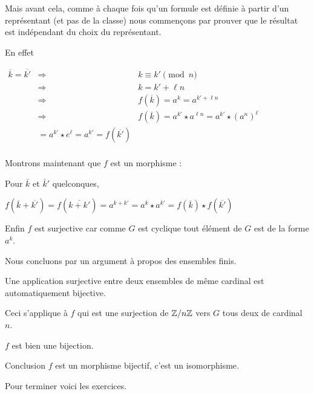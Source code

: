 \change

Mais avant cela, comme à chaque fois qu'un formule est définie
à partir d'un représentant (et pas de la classe) nous commençons
par prouver que le résultat est indépendant du choix du représentant.

En effet

$\begin{array}{rcl}
 \overline{k}=\overline{k'} 
    & \Rightarrow & k \equiv k' \pmod n \\
    & \Rightarrow & k = k' + \ell n \\
    & \Rightarrow & f(\overline{k}) = a^k = a^{k'+\ell n}  \\
    & \Rightarrow & f(\overline{k}) = a^{k'} \star a^{\ell n}=
a^{k'} \star (a^n)^\ell \\
& = a^{k'} \star e^\ell = a^{k'} = f(\overline{k'}) \\
\end{array}
$


\change

Montrons maintenant que $f$ est un morphisme :

Pour $\bar k$ et $\bar k'$ quelconques,

$f(\overline{k}+\overline{k'})
= f(\overline{k+k'}) = a^{k+k'}=a^{k} \star a^{k'}= f(\overline k) \star f(\overline{k'})$ 

\change

Enfin $f$ est surjective car comme $G$ est cyclique tout élément 
de $G$ est de la forme $a^k$.

\change

Nous concluons par un argument à propos des ensembles finis.

Une application surjective entre deux ensembles de même cardinal
 est automatiquement  bijective. 

Ceci s'applique à $f$ qui est une surjection de $\mathbb{Z}/n\mathbb{Z}$ vers $G$ 
tous deux de cardinal $n$. 

$f$ est bien une bijection.

\change

Conclusion $f$ est un morphisme bijectif, c'est un isomorphisme.

\change

\diapo

Pour terminer voici les exercices.

